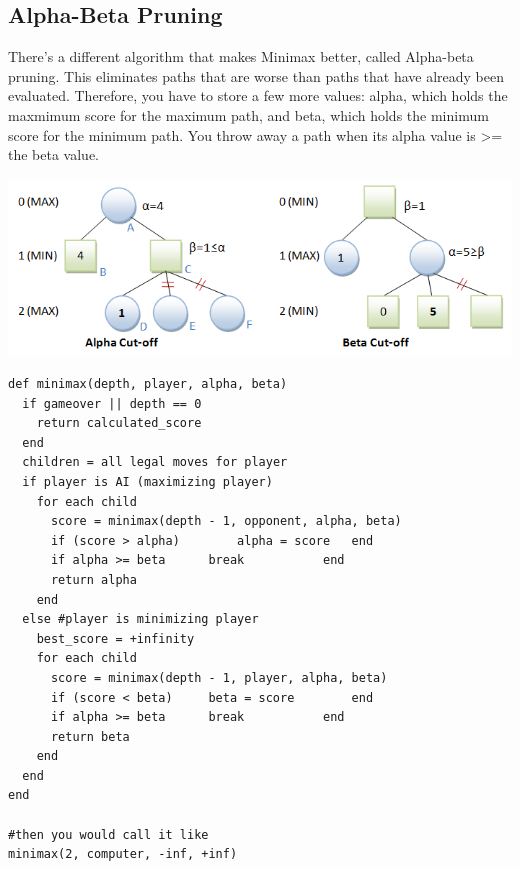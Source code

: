 \subsection{Alpha-Beta Pruning}

There’s a different algorithm that makes Minimax better, called Alpha-beta pruning. This eliminates paths that are worse than paths that have already been evaluated. Therefore, you have to store a few more values: alpha, which holds the maxmimum score for the maximum path, and beta, which holds the minimum score for the minimum path. You throw away a path when its alpha value is \textgreater= the beta value. \\

\begin{center}
\includegraphics[width=1.1\textwidth]{./GameTTT_alphabeta}
\end{center}

\begin{lstlisting}
def minimax(depth, player, alpha, beta)
  if gameover || depth == 0
    return calculated_score
  end
  children = all legal moves for player
  if player is AI (maximizing player)
    for each child
      score = minimax(depth - 1, opponent, alpha, beta)
      if (score > alpha)		alpha = score	end
      if alpha >= beta     	break			end
      return alpha
    end
  else #player is minimizing player
    best_score = +infinity
    for each child
      score = minimax(depth - 1, player, alpha, beta)
      if (score < beta)		beta = score		end
      if alpha >= beta		break			end
      return beta
    end
  end
end

#then you would call it like
minimax(2, computer, -inf, +inf)
\end{lstlisting}